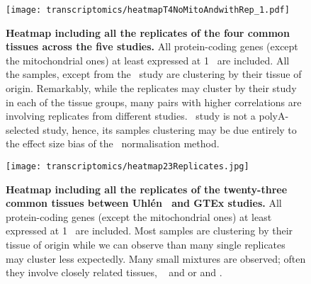 \begin{figure}[htpb]
    \texttt{[image: transcriptomics/heatmapT4NoMitoAndwithRep\_1.pdf]}\centering
    \vspace{-7mm}
    \caption[Heatmap including all the replicates of the 4 common tissues
    across the 5 studies]{\label{fig:noMitoRep4T}\textbf{Heatmap including all
    the replicates of the four common tissues across the five studies.}
    All protein-coding genes (except the mitochondrial ones)
    at least expressed at 1 \FPKM\ are included. All the samples, except from the
    \castle\ study are clustering by their tissue of origin.
    Remarkably, while the replicates may cluster by their study in each of the
    tissue groups, many pairs with higher correlations are involving replicates
    from different studies. \castle\ study is not a polyA-selected study, hence,
    its samples clustering may be due entirely to the effect size bias of the
    \FPKM\ normalisation method.}
\end{figure}

\begin{figure}[htpb]
    \texttt{[image: transcriptomics/heatmap23Replicates.jpg]}\centering
    \caption[Heatmap including all the replicates of the 23 common tissues
    between Uhlén and GTEx studies]{\label{fig:noMitoRep23T}\textbf{Heatmap
    including all the replicates of the twenty-three common tissues between
    Uhlén \etal\ and GTEx studies.} All protein-coding genes (except the mitochondrial ones)
    at least expressed at 1 \FPKM\ are included. Most samples are clustering by
    their tissue of origin while we can observe than many single replicates may
    cluster less expectedly. Many small mixtures are observed; often they involve
    closely related tissues, \ie\  and  or
     and .}
\end{figure}



